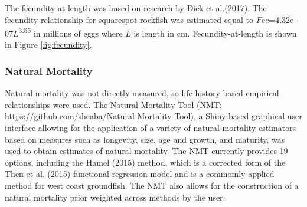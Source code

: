\documentclass[11pt,
  english,
  a4paper,
]{article}
\begin{document}
\leavevmode\tagmcend\tagstructend\par


The fecundity-at-length was based on research by Dick et al.{(2017)\leavevmode\tagmcend\tagstructend}. The fecundity relationship for squarespot rockfish was estimated equal to {\(Fec\)\leavevmode\tagmcend\tagstructend}=4.32e-07{\(L\)\leavevmode\tagmcend\tagstructend}\textsuperscript{3.55} in millions of eggs where {\(L\)\leavevmode\tagmcend\tagstructend} is length in cm. Fecundity-at-length is shown in Figure \ref{fig:fecundity}.

\leavevmode\tagmcend\tagstructend\par


\hypertarget{natural-mortality}{%
\subsubsection{Natural Mortality}\label{natural-mortality}}

\leavevmode\tagmcend\tagstructend


Natural mortality was not directly measured, so life-history based empirical relationships were used. The Natural Mortality Tool (NMT; {\url{https://github.com/shcaba/Natural-Mortality-Tool}\leavevmode\tagmcend\tagstructend}), a Shiny-based graphical user interface allowing for the application of a variety of natural mortality estimators based on measures such as longevity, size, age and growth, and maturity, was used to obtain estimates of natural mortality. The NMT currently provides 19 options, including the Hamel {(2015)\leavevmode\tagmcend\tagstructend} method, which is a corrected form of the Then et al. {(2015)\leavevmode\tagmcend\tagstructend} functional regression model and is a commomly applied method for west coast groundfish. The NMT also allows for the construction of a natural mortality prior weighted across methods by the user.

\leavevmode\tagmcend\tagstructend\par
\end{document}
